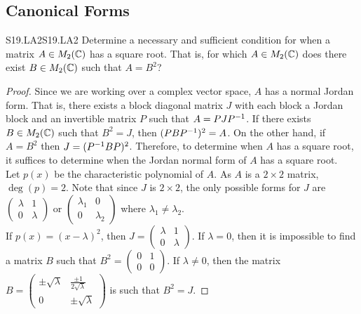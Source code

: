\documentclass[../AlgebraQualSolutions.tex]{subfiles}
\begin{document}
\subsection{Canonical Forms}

\begin{prob}{S19.LA2}{S19.LA2}
    Determine a necessary and sufficient condition for when a matrix $A \in M_2(\mathbb{C})$ has a square root. That is, for which $A \in M_2(\mathbb{C})$ does there exist $B \in M_2(\mathbb{C})$ such that $A = B^2$?
\end{prob}

\begin{proof}
    Since we are working over a complex vector space, $A$ has a normal Jordan form. That is, there exists a block diagonal matrix $J$ with each block a  Jordan block and an invertible matrix $P$ such that $A = P J P^{-1}$. If there exists $B \in M_2(\mathbb{C})$ such that $B^2 = J$, then $(PBP^{-1})^2 = A$. On the other hand, if $A = B^2$ then $J = (P^{-1} B P)^2$. Therefore, to determine when $A$ has a square root, it suffices to determine when the Jordan normal form of $A$ has a square root.\\
    
    
    Let $p(x)$ be the characteristic polynomial of $A$. As $A$ is a $2 \times 2$ matrix, $\deg(p) = 2$. Note that since $J$ is $2 \times 2$, the only possible forms for $J$ are $\begin{pmatrix} \lambda & 1\\ 0 & \lambda \end{pmatrix}$ or $\begin{pmatrix} \lambda_1 & 0\\ 0 & \lambda_2 \end{pmatrix}$ where $\lambda_1 \neq \lambda_2$.\\ 
    
    If $p(x) = (x-\lambda)^2$, then $J = \begin{pmatrix} \lambda & 1\\ 0 & \lambda \end{pmatrix}$.  If $\lambda = 0$, then it is impossible to find a matrix $B$ such that $B^2 = \begin{pmatrix} 0 & 1\\ 0 & 0 \end{pmatrix}$. If $\lambda \neq 0$, then the matrix $B = \begin{pmatrix} \pm \sqrt\lambda & \frac{\pm1}{2 \sqrt \lambda}\\ 0 & \pm \sqrt\lambda \end{pmatrix}$ is such that $B^2 = J$.
    

\end{proof}
\end{document}
